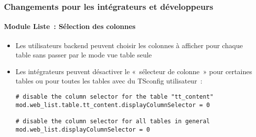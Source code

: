 %

\begin{frame}[fragile]
	\frametitle{Changements pour les intégrateurs et développeurs}
	\framesubtitle{Module Liste~: Sélection des colonnes}


	\begin{itemize}
		\item Les utilisateurs backend peuvent choisir les colonnes à afficher pour chaque table
			sans passer par le mode vue table seule
		\item Les intégrateurs peuvent désactiver le «~sélecteur de colonne~» pour certaines tables
			ou pour toutes les tables avec du TSconfig utilisateur~:
\begin{lstlisting}
# disable the column selector for the table "tt_content"
mod.web_list.table.tt_content.displayColumnSelector = 0

# disable the column selector for all tables in general
mod.web_list.displayColumnSelector = 0
\end{lstlisting}

	\end{itemize}

\end{frame}

